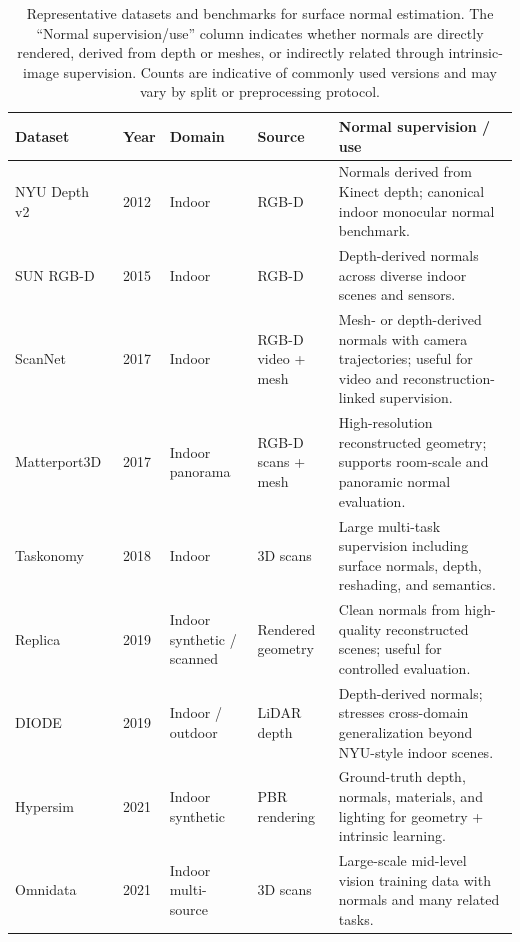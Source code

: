 \begin{table}[!t]
\centering
\caption{Representative datasets and benchmarks for surface normal estimation. The ``Normal supervision/use'' column indicates whether normals are directly rendered, derived from depth or meshes, or indirectly related through intrinsic-image supervision. Counts are indicative of commonly used versions and may vary by split or preprocessing protocol.}
\label{tab:normal_dataset}
\fontsize{9}{11}\selectfont
\setlength{\tabcolsep}{4pt}
\begin{tabular}{L{0.15\textwidth}C{0.1\textwidth} C{0.15\textwidth}C{0.15\textwidth}L{0.35\textwidth}}
\toprule
\textbf{Dataset} & \textbf{Year} & \textbf{Domain} & \textbf{Source} & \textbf{Normal supervision / use} \\
\midrule
NYU Depth v2~\cite{silberman2012nyudv2} & 2012 & Indoor & RGB-D & Normals derived from Kinect depth; canonical indoor monocular normal benchmark. \\
SUN RGB-D~\cite{song2015sunrgbd} & 2015 & Indoor & RGB-D & Depth-derived normals across diverse indoor scenes and sensors. \\
ScanNet~\cite{dai2017scannet} & 2017 & Indoor & RGB-D video + mesh & Mesh- or depth-derived normals with camera trajectories; useful for video and reconstruction-linked supervision. \\
Matterport3D~\cite{chang2017matterport3d} & 2017 & Indoor panorama & RGB-D scans + mesh & High-resolution reconstructed geometry; supports room-scale and panoramic normal evaluation. \\
Taskonomy~\cite{zamir2018taskonomy} & 2018 & Indoor & 3D scans & Large multi-task supervision including surface normals, depth, reshading, and semantics. \\
Replica~\cite{straub2019replica} & 2019 & Indoor synthetic / scanned & Rendered geometry & Clean normals from high-quality reconstructed scenes; useful for controlled evaluation. \\
DIODE~\cite{vasiljevic2019diode} & 2019 & Indoor / outdoor & LiDAR depth & Depth-derived normals; stresses cross-domain generalization beyond NYU-style indoor scenes. \\
Hypersim~\cite{roberts2021hypersim} & 2021 & Indoor synthetic & PBR rendering & Ground-truth depth, normals, materials, and lighting for geometry + intrinsic learning. \\
Omnidata~\cite{eftekhar2021omnidata} & 2021 & Indoor multi-source & 3D scans & Large-scale mid-level vision training data with normals and many related tasks. \\
\bottomrule
\end{tabular}
\end{table}


